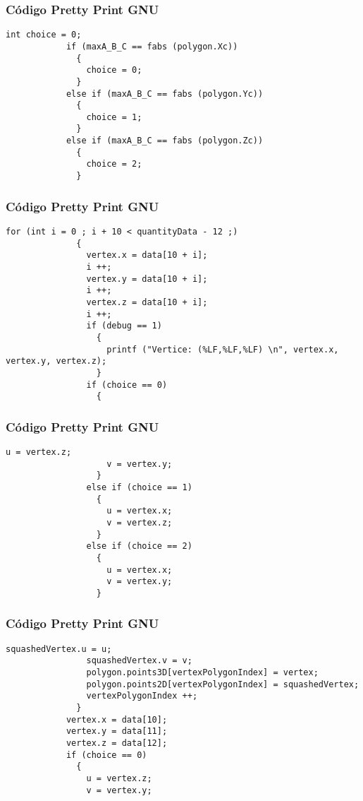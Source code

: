 \documentclass{beamer}
\begin{document}
\begin{frame}[fragile]
\frametitle{C\'odigo Pretty Print GNU}
\begin{lstlisting}[style=CStyle]
            int choice = 0;
            if (maxA_B_C == fabs (polygon.Xc))
              {
                choice = 0;
              }
            else if (maxA_B_C == fabs (polygon.Yc))
              {
                choice = 1;
              }
            else if (maxA_B_C == fabs (polygon.Zc))
              {
                choice = 2;
              }
\end{lstlisting}
\end{frame}
\begin{frame}[fragile]
\frametitle{C\'odigo Pretty Print GNU}
\begin{lstlisting}[style=CStyle]
            for (int i = 0 ; i + 10 < quantityData - 12 ;)
              {
                vertex.x = data[10 + i];
                i ++;
                vertex.y = data[10 + i];
                i ++;
                vertex.z = data[10 + i];
                i ++;
                if (debug == 1)
                  {
                    printf ("Vertice: (%LF,%LF,%LF) \n", vertex.x, vertex.y, vertex.z);
                  }
                if (choice == 0)
                  {
                    \end{lstlisting}
\end{frame}
\begin{frame}[fragile]
\frametitle{C\'odigo Pretty Print GNU}
\begin{lstlisting}[style=CStyle]
                    u = vertex.z;
                    v = vertex.y;
                  }
                else if (choice == 1)
                  {
                    u = vertex.x;
                    v = vertex.z;
                  }
                else if (choice == 2)
                  {
                    u = vertex.x;
                    v = vertex.y;
                  }
\end{lstlisting}
\end{frame}
\begin{frame}[fragile]
\frametitle{C\'odigo Pretty Print GNU}
\begin{lstlisting}[style=CStyle]
                squashedVertex.u = u;
                squashedVertex.v = v;
                polygon.points3D[vertexPolygonIndex] = vertex;
                polygon.points2D[vertexPolygonIndex] = squashedVertex;
                vertexPolygonIndex ++;
              }
            vertex.x = data[10];
            vertex.y = data[11];
            vertex.z = data[12];
            if (choice == 0)
              {
                u = vertex.z;
                v = vertex.y;
\end{lstlisting}
\end{frame}
\end{document}
